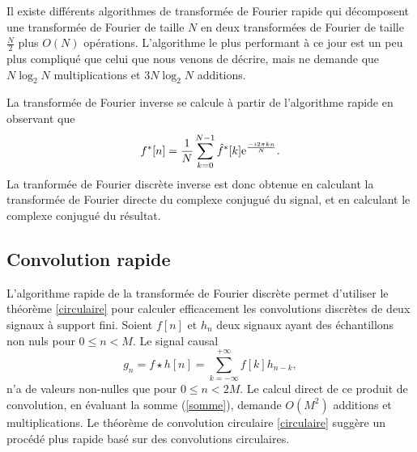 Il existe diff\'erents algorithmes de transform\'ee de Fourier
rapide qui d\'ecomposent une transform\'ee de Fourier
de taille $N$ en deux transform\'ees de Fourier de taille ${\frac N 2}$
plus $O(N)$ op\'erations. L'algorithme le plus performant \`a ce
jour est un peu plus compliqu\'e que celui que nous venons de
d\'ecrire, mais ne demande que $N \log_2 N$ multiplications
et $3N \log_2 N$ additions.

La transform\'ee de Fourier inverse se calcule \`a partir
de l'algorithme rapide en observant que
\begin{equation}
f^*[n] = \frac 1 N \sum_ {k=0}^ {N-1}  \hat f^*[k]
\mathrm{e}^{\frac {-i 2 \pi kn} N} .
\end{equation}
La tranform\'ee de Fourier discr\`ete inverse est donc obtenue en
calculant la transform\'ee de Fourier directe du complexe conjugu\'e
du signal, et en calculant le complexe conjugu\'e du r\'esultat.


\subsection{Convolution rapide}
\label{convol-rap-sec}

L'algorithme rapide de la transform\'ee de Fourier
discr\`ete permet d'utiliser le th\'eor\`eme \ref{circulaire} pour
calculer efficacement les convolutions discr\`etes de
deux signaux \`a support fini.
Soient $f[n]$ et $h_n$ deux signaux ayant
des \'echantillons non nuls pour $0 \leq n < M$.
Le signal causal
\begin{equation}
\label{somme}
g_n = f \star h [n] = \sum_{k=- \infty}^{+ \infty} f[k] h _{n-k} ,
\end{equation}
n'a de valeurs non-nulles que pour $0 \leq n < 2M$.
Le calcul direct de ce produit
de convolution, en \'evaluant la somme (\ref{somme}), demande
$O(M^2)$ additions et multiplications.
Le th\'eor\`eme de convolution circulaire \ref{circulaire}
sugg\`ere un proc\'ed\'e plus rapide
bas\'e sur des convolutions circulaires.

